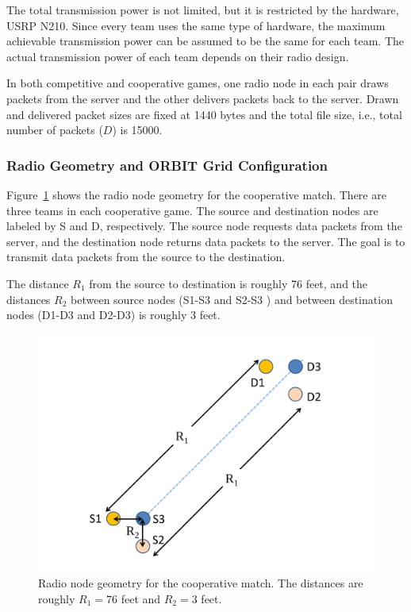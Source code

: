The total transmission power is not limited, but it is restricted by the hardware, USRP N210. Since every team uses the same type of hardware, the maximum achievable transmission power can be assumed to be the same for each team. The actual transmission power of each team depends on their radio design.

In both competitive and cooperative games, one radio node in each pair draws packets from the server and the other delivers packets back to the server. Drawn and delivered packet sizes are fixed at 1440 bytes and the total file size, i.e., total number of packets ($D$) is 15000.

\subsubsection{Radio Geometry and ORBIT Grid Configuration}
Figure~\ref{fig:CooperativeNodeAssignement} shows the radio node geometry for the cooperative match. There are three teams in each cooperative game. The source and destination nodes are labeled by S and D, respectively. The source node requests data packets from the server, and the destination node returns data packets to the server. The goal is to transmit data packets from the source to the destination.

The distance $R_1$ from the source to destination is roughly 76 feet, and the distances $R_2$ between source nodes (S1-S3 and S2-S3 ) and between destination nodes (D1-D3 and D2-D3) is roughly 3 feet.

\begin{figure}[tpb]
  \begin{center}
    \centerline{\includegraphics[width=150mm]{CooperativeNodeAssignement.pdf}}
    \caption{Radio node geometry for the cooperative match. The distances are roughly $R_1=76$ feet and $R_2=3$ feet.}
    \label{fig:CooperativeNodeAssignement}
  \end{center}
\end{figure}

